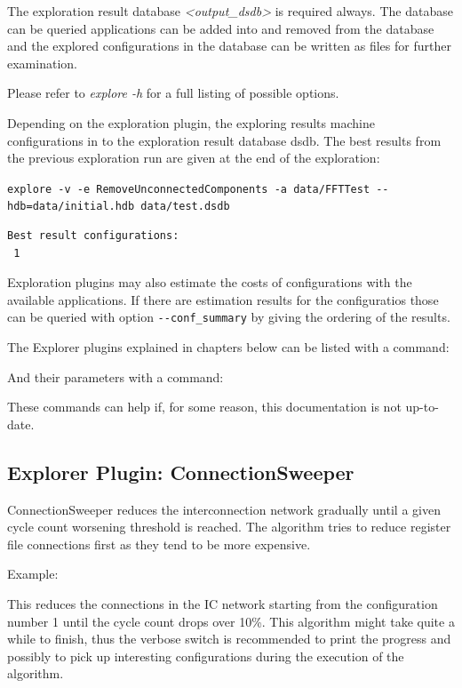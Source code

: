 \documentclass[a4paper,twoside]{tceusermanual}
\begin{document}
The exploration result database \emph{<output\_dsdb>} is required always. The
database can be queried applications can be added into and removed from the 
database and the explored configurations in the database can be written as
files for further examination.

Please refer to \textit{explore -h} for a full listing of possible options.

Depending on the exploration plugin, the exploring results machine
configurations in to the exploration result database dsdb. The best results
from the previous exploration run are given at the end of the exploration:

\verb|explore -v -e RemoveUnconnectedComponents -a data/FFTTest --hdb=data/initial.hdb data/test.dsdb|

\begin{verbatim}
Best result configurations:
 1
\end{verbatim}
Exploration plugins may also estimate the costs of configurations with the
available applications. If there are estimation results for the configuratios
those can be queried with option \verb|--conf_summary| by giving the
ordering of the results.

The Explorer plugins explained in chapters below can be listed with a command:


And their parameters with a command:


These commands can help if, for some reason, this documentation is not up-to-date.

\subsection{Explorer Plugin: ConnectionSweeper}
\label{ConnectionSweeper}
ConnectionSweeper reduces the interconnection network gradually until a
given cycle count worsening threshold is reached. The algorithm tries to
reduce register file connections first as they tend to be more expensive.

Example:


This reduces the connections in the IC network starting from the configuration 
number 1 until the cycle count drops over 10\%. This algorithm might take 
quite a while to finish, thus the verbose switch is recommended to print 
the progress and possibly to pick up interesting configurations during the 
execution of the algorithm.
\end{document}
